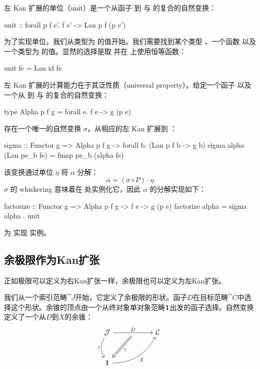 \documentclass[DaoFP]{subfiles}
\begin{document}
左 Kan 扩展的单位（unit）是一个从函子  到  与  的复合的自然变换：
\begin{haskell}
unit :: forall p f e'. 
    f e' -> Lan p f (p e')
\end{haskell}
为了实现单位，我们从类型为  的值开始。我们需要找到某个类型 、一个函数  以及一个类型为  的值。显然的选择是取  并在  上使用恒等函数：
\begin{haskell}
unit fe = Lan id fe 
\end{haskell}

左 Kan 扩展的计算能力在于其泛性质（universal property）。给定一个函子  以及一个从  到  与  的复合的自然变换：
\begin{haskell}
type Alpha p f g = forall e. f e -> g (p e)
\end{haskell}
存在一个唯一的自然变换 $\sigma$，从相应的左 Kan 扩展到 ：
\begin{haskell}
sigma :: Functor g => Alpha p f g -> forall b. (Lan p f b -> g b)
sigma alpha (Lan pe_b fe) = fmap pe_b (alpha fe)
\end{haskell}
该变换通过单位 $\eta$ 将 $\alpha$ 分解：
\[ \alpha = (\sigma \circ P) \cdot \eta \]
$\sigma$ 的 whiskering 意味着在  处实例化它，因此 $\alpha$ 的分解实现如下：
\begin{haskell}
factorize :: Functor g => Alpha p f g -> f e -> g (p e)
factorize alpha = sigma alpha . unit
\end{haskell}
\begin{exercise}
为  实现  实例。
\end{exercise}

\subsection{余极限作为Kan扩张}

正如极限可以定义为右Kan扩张一样，余极限也可以定义为左Kan扩张。

我们从一个索引范畴$\cat J$开始，它定义了余极限的形状。函子$D$在目标范畴$\cat C$中选择这个形状。余锥的顶点由一个从终对象单对象范畴$\mathbf{1}$出发的函子选择。自然变换定义了一个从$D$到$X$的余锥：
\[
 \begin{tikzcd} [row sep=1cm, column sep=1cm]
 \cat J
 \arrow[rr, "D", "" {name=ID, below} ]
 \arrow[d, bend right, "!"']
 && \cat C
 \\
 \Cat 1
  \arrow[urr, bend right, "X"']
 \arrow[Rightarrow, "\gamma",  from=ID]
 \end{tikzcd}
\]
\end{document}
